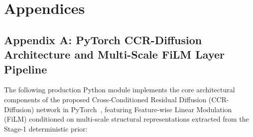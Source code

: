 \chapter*{Appendices}

\section*{Appendix A: PyTorch CCR-Diffusion Architecture and Multi-Scale FiLM Layer Pipeline}

The following production Python module implements the core architectural components of the proposed Cross-Conditioned Residual Diffusion (CCR-Diffusion) network in PyTorch~\cite{paszke2019pytorch}, featuring Feature-wise Linear Modulation (FiLM) conditioned on multi-scale structural representations extracted from the Stage-1 deterministic prior:

